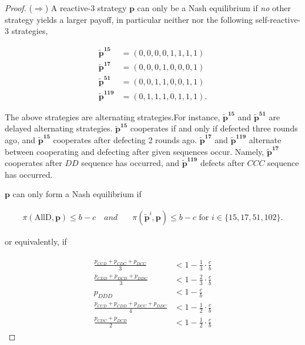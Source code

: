 \documentclass[11pt]{article}
\theoremstyle{plainCl1}
\theoremstyle{plainCl2}
\begin{document}
\begin{proof}
($\Rightarrow$) A reactive-3 strategy \(\mathbf{p}\) can only
be a Nash equilibrium if {\it no} other strategy yields a larger payoff, in
particular neither  nor the following self-reactive-3 strategies,

\begin{align*}
\mathbf{\tilde{p}^{15}} & = (0, 0, 0, 0, 1, 1, 1, 1) \\
\mathbf{\tilde{p}^{17}} & = (0, 0, 0, 1, 0, 0, 0, 1) \\
\mathbf{\tilde{p}^{51}} & = (0, 0, 1, 1, 0, 0, 1, 1) \\
\mathbf{\tilde{p}^{119}} & = (0, 1, 1, 1, 0, 1, 1, 1).
\end{align*}

The above strategies are alternating strategies.For instance,
\(\mathbf{\tilde{p}^{15}}\) and \(\mathbf{\tilde{p}^{51}}\) are delayed
alternating strategies. \(\mathbf{\tilde{p}^{15}}\) cooperates if and only if
defected three rounds ago, and \(\mathbf{\tilde{p}^{15}}\) cooperates after
defecting 2 rounds ago. \(\mathbf{\tilde{p}^{17}}\) and
\(\mathbf{\tilde{p}^{119}}\) alternate between cooperating and defecting after
given sequences occur. Namely,
\(\mathbf{\tilde{p}^{17}}\) cooperates after $DD$ sequence has occurred, and
\(\mathbf{\tilde{p}^{119}}\) defects after $CCC$ sequence has occurred.

\(\mathbf{p}\) can only form a Nash equilibrium if

\begin{align*}
\pi(\text{AllD}, \mathbf{p}) \leq b\!-\!c \quad { and } \quad & \pi(\mathbf{\tilde{p}}^{i}, \mathbf{p}) \leq b\!-\!c \text{ for } i \in \{15, 17, 51, 102\}.
\end{align*}

or equivalently, if

\begin{align}\label{Eq:NashConditionDonationGameN3}
  \begin{split}
    \frac{p_{CCD} + p_{CDC} + p_{DCC}}{3} & < 1\!-\! \frac{1}{3} \cdot \frac{c}{b} \\
    \frac{p_{CDD} + p_{DCD} + p_{DDC}}{3} & < 1\!-\! \frac{2}{3} \cdot \frac{c}{b} \\
    p_{DDD} & < 1\!-\! \frac{c}{b} \\
    \frac{p_{CCD} + p_{CDD} + p_{DCC} + p_{DDC}}{4}  & < 1\!-\! \frac{1}{2} \cdot \frac{c}{b} \\
    \frac{p_{CDC} + p_{DCD}}{2} & < 1\!-\! \frac{1}{2} \cdot \frac{c}{b}
  \end{split}
\end{align}


\end{proof}
\end{document}
